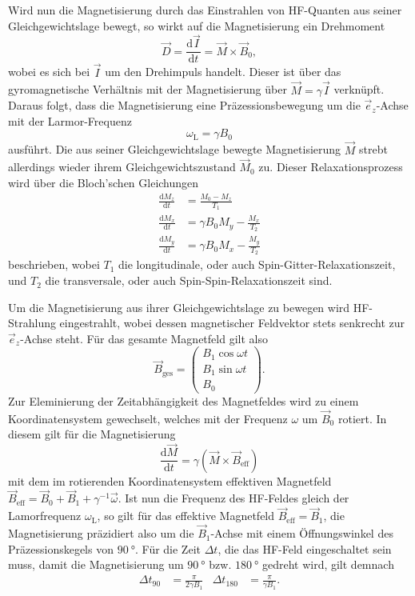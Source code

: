 Wird nun die Magnetisierung durch das Einstrahlen von HF-Quanten aus seiner Gleichgewichtslage bewegt, so wirkt auf die Magnetisierung ein Drehmoment
\begin{equation*}
  \vec{D} = \frac{\mathrm{d}\vec{I}}{\mathrm{d}t} = \vec{M} \times \vec{B}_0,
\end{equation*}
wobei es sich bei $\vec{I}$ um den Drehimpuls handelt. Dieser ist über das gyromagnetische Verhältnis mit der Magnetisierung über $\vec{M} = \gamma \vec{I}$ verknüpft. Daraus folgt, dass die Magnetisierung eine Präzessionsbewegung um die $\vec{e}_z$-Achse mit der Larmor-Frequenz
\begin{equation*}
  \omega_\mathrm{L} = \gamma B_0
\end{equation*}
ausführt. Die aus seiner Gleichgewichtslage bewegte Magnetisierung $\vec{M}$ strebt allerdings wieder ihrem Gleichgewichtszustand $\vec{M}_0$ zu. Dieser Relaxationsprozess wird über die Bloch'schen Gleichungen
\begin{align*}
  \frac{\mathrm{d}M_z}{\mathrm{d}t} &= \frac{M_0 - M_z}{T_1} \\
  \frac{\mathrm{d}M_x}{\mathrm{d}t} &= \gamma B_0 M_y - \frac{M_x}{T_2} \\
  \frac{\mathrm{d}M_y}{\mathrm{d}t} &= \gamma B_0 M_x - \frac{M_y}{T_2}
\end{align*}
beschrieben, wobei $T_1$ die longitudinale, oder auch Spin-Gitter-Relaxationszeit, und $T_2$ die transversale, oder auch Spin-Spin-Relaxationszeit sind.

Um die Magnetisierung aus ihrer Gleichgewichtslage zu bewegen wird HF-Strahlung eingestrahlt, wobei dessen magnetischer Feldvektor stets senkrecht zur $\vec{e}_z$-Achse steht. Für das gesamte Magnetfeld gilt also
\begin{equation*}
  \vec{B}_\mathrm{ges} = \begin{pmatrix} B_1 \cos \omega t \\ B_1 \sin \omega t \\ B_0 \end{pmatrix}.
\end{equation*}
Zur Eleminierung der Zeitabhängigkeit des Magnetfeldes wird zu einem Koordinatensystem gewechselt, welches mit der Frequenz $\omega$ um $\vec{B}_0$ rotiert. In diesem gilt für die Magnetisierung
\begin{equation*}
  \frac{\mathrm{d}\vec{M}}{\mathrm{d}t} = \gamma \left( \vec{M} \times \vec{B}_\mathrm{eff} \right)
\end{equation*}
mit dem im rotierenden Koordinatensystem effektiven Magnetfeld $\vec{B}_\mathrm{eff} = \vec{B}_0 + \vec{B}_1 + \gamma^{-1} \vec{\omega}$.
Ist nun die Frequenz des HF-Feldes gleich der Lamorfrequenz $\omega_\mathrm{L}$, so gilt für das effektive Magnetfeld $\vec{B}_\mathrm{eff} = \vec{B}_1$, die Magnetisierung präzidiert also um die $\vec{B}_1$-Achse mit einem Öffnungswinkel des Präzessionskegels von $\SI{90}{\degree}$. Für die Zeit $\Delta t$, die das HF-Feld eingeschaltet sein muss, damit die Magnetisierung um $\SI{90}{\degree}$ bzw. $\SI{180}{\degree}$ gedreht wird, gilt demnach
\begin{align*}
  \Delta t_{90} &= \frac{\pi}{2 \gamma B_1} & \Delta t_{180} &= \frac{\pi}{\gamma B_1}.
\end{align*}


